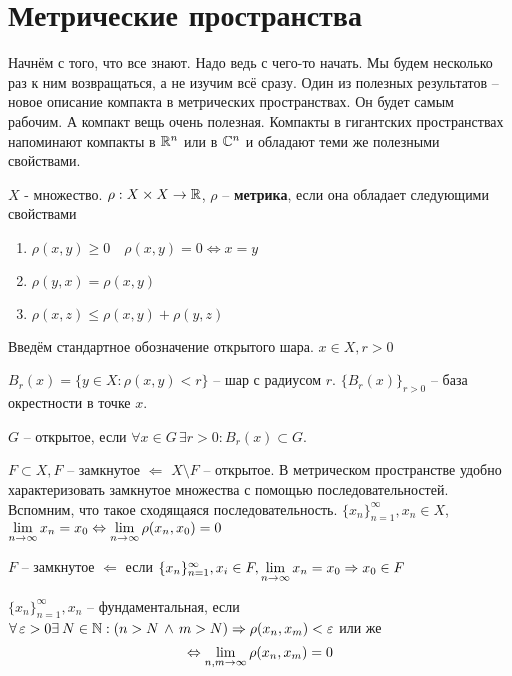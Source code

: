 \documentclass[document]{subfiles}
\begin{document}
\chapter{Метрические пространства}
Начнём с того, что все знают. Надо ведь с чего-то начать. Мы будем несколько раз к ним возвращаться, а не изучим всё сразу. Один из полезных результатов -- новое описание компакта в метрических пространствах. Он будет
самым рабочим. А компакт вещь очень полезная. Компакты в гигантских пространствах напоминают компакты в $\mathbb{R}^n$ или в $\mathbb{C}^n$ и обладают теми же полезными свойствами.

\begin{definition}[Метрика]
    $X$ - множество. $\rho: X \times X \rightarrow \mathbb{R}$, $\rho$ -- \textbf{метрика}, если она обладает следующими свойствами
    \begin{enumerate}
        \item $\rho(x,y) \geq 0 \quad \rho(x,y) = 0 \Leftrightarrow x = y$
        \item $\rho(y,x) = \rho(x,y)$
        \item $\rho(x,z) \leq \rho(x,y) + \rho(y,z)$
    \end{enumerate}
\end{definition}

Введём стандартное обозначение открытого шара. $x \in X, r > 0$

$B_r(x) = \{y \in X: \rho(x,y) < r \}$ -- шар с радиусом $r$.
$ \{B_r(x) \}_{r > 0}$ -- база окрестности в точке $x$.

$G$ -- открытое, если $\forall x \in G \, \exists r > 0 : B_r(x) \subset G$.

$F \subset X, F$ -- замкнутое $\Leftarrow$ $X \setminus F$ -- открытое.
В метрическом пространстве удобно характеризовать замкнутое множества с помощью последовательностей. Вспомним, что такое сходящаяся последовательность.
$\{x_n\}_{n=1}^\infty, x_n \in X$, $\lim\limits_{n \to \infty} x_n = x_0 \Leftrightarrow \lim\limits_{n \to \infty} \rho(x_n, x_0) = 0$

$F$ -- замкнутое $\Leftarrow$ если $\{x_n\}_{n=1}^\infty, x_i  \in F, \lim\limits_{n \to \infty } x_n = x_0 \Rightarrow x_0 \in F$


\begin{definition}
    $\{x_n\}^\infty_{n=1}, x_n$ -- фундаментальная, если $\forall \varepsilon > 0 \exists N \in \bN : (n > N \, \wedge \, m > N) \Rightarrow \rho(x_n, x_m) < \varepsilon$
    или же 
    \[ \Leftrightarrow \lim\limits_{n,m \to \infty} \rho(x_n,x_m) = 0 \]
\end{definition}
\end{document}
